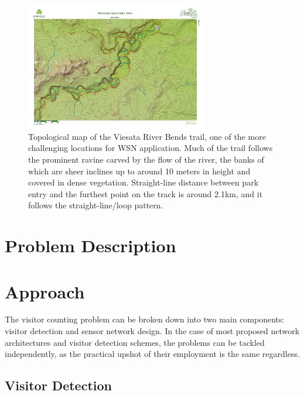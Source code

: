 \documentclass[10pt,nocopyrightspace]{ewsn-proc}
\begin{document}
\begin{figure}[t!]
\centering
\includegraphics[height=2.2in]{./Images/map1-Viesata}
\caption{Topological map of the Viesata River Bends trail, one of the more challenging locations for WSN application. Much of the trail follows the prominent ravine carved by the flow of the river, the banks of which are sheer inclines up to around 10 meters in height and covered in dense vegetation. Straight-line distance between park entry and the furthest point on the track is around 2.1km, and it follows the straight-line/loop pattern.}
\end{figure}

\section{Problem Description}

\section{Approach}
The visitor counting problem can be broken down into two main components: visitor detection and sensor network design. In the case of most proposed network architectures and visitor detection schemes, the problems can be tackled independently, as the practical upshot of their employment is the same regardless.

\subsection{Visitor Detection}
\end{document}
